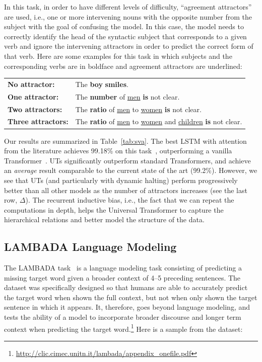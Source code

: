 In this task, in order to have different levels of difficulty, ``agreement attractors'' are used, i.e., one or more intervening nouns with the opposite number from the subject with the goal of confusing the model. In this case, the model needs to correctly identify the head of the syntactic subject that corresponds to a given verb and ignore the intervening attractors in order to predict the correct form of that verb.
Here are some examples for this task in which subjects and the corresponding verbs are in boldface and agreement attractors are underlined:
\begin{table}[h!]
\fontsize{9}{10}\selectfont
\begin{tabular}{l l}
\textbf{No attractor:} & The \textbf{boy} \textbf{smiles}. \\
\textbf{One attractor:}  &  The \textbf{number} of \underline{men} \textbf{is} not clear. \\
\textbf{Two attractors:}  &  The \textbf{ratio} of \underline{men} to \underline{women} \textbf{is} not clear. \\
\textbf{Three attractors:} &  The \textbf{ratio} of \underline{men} to \underline{women} and \underline{children} \textbf{is} not clear. 
\end{tabular}
\end{table}
Our results are summarized in Table~\ref{tab:sva}. The best LSTM with attention from the literature achieves 99.18\% on this task~\citep{yogatama2018memory}, outperforming a vanilla Transformer~\citep{tran18}. UTs significantly outperform standard Transformers, and achieve an \emph{average} result comparable to the current state of the art (99.2\%). However, we see that UTs (and particularly with dynamic halting) perform progressively better than all other models as the number of attractors increases (see the last row, $\Delta$).
The recurrent inductive bias, i.e., the fact that we can repeat the computations in depth, helps the Universal Transformer to capture the hierarchical relations and better model the structure of the data.

\subsection{LAMBADA Language Modeling}
The LAMBADA task~\citep{paperno2016lambada} is a language modeling task consisting of predicting a missing target word given a broader context of 4--5 preceding sentences. The dataset was specifically designed so that humans are able to accurately predict the target word when shown the full context, but not when only shown the target sentence in which it appears. It, therefore, goes beyond language modeling, and tests the ability of a model to incorporate broader discourse and longer term context when predicting the target word.\footnote{\url{http://clic.cimec.unitn.it/lambada/appendix_onefile.pdf}}
Here is a sample from the dataset:

